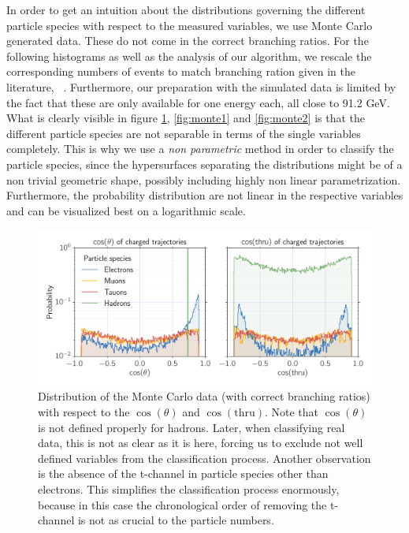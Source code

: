 \label{sub:montecarlo}
In order to get an intuition about the distributions governing the different particle species with respect to the measured
variables, we use Monte Carlo generated data. These do not come in the correct branching ratios. For the following histograms 
as well as the analysis of our algorithm, we rescale the corresponding numbers of events to match branching ration given 
in the literature, ~\cite{pdg}. Furthermore, our preparation with the simulated data is limited by the fact that these are 
only available for one energy each, all close to 91.2 GeV.  
What is clearly visible in figure \ref{fig:cos_figs}, \ref{fig:monte1} and \ref{fig:monte2} is that the
different particle species are not separable in terms of the single variables completely. This is why we use a 
\textit{non parametric} method in order to classify the particle species, since the hypersurfaces separating the distributions
might be of a non trivial geometric shape, possibly including highly non linear parametrization. 
Furthermore, the probability distribution are not linear in the respective variables and can be visualized best on a logarithmic 
scale.
\begin{figure}[htpb]
    \centering
    \includegraphics[width=1.0\linewidth]{figures/cos_figs}
    \caption{Distribution of the Monte Carlo data (with correct branching ratios) 
    with respect to the $\cos(\theta)$ and $\cos(\mathrm{thru})$. Note that $\cos(\theta)$ is not defined properly
    for hadrons. Later, when classifying
    real data, this is not as clear as it is here, forcing us to exclude not well defined variables from the classification process.
    Another observation is the absence of the t-channel in particle species other than electrons. This simplifies 
    the classification process enormously, because in this case the chronological 
    order of removing the t-channel is not as crucial to the particle numbers.}
    \label{fig:cos_figs}
\end{figure}

